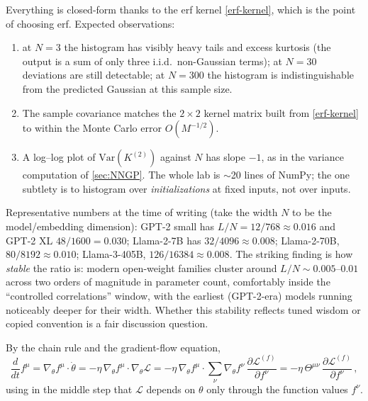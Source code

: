 \documentclass[11pt]{article}
\newcommand{\CL}{{\mathcal L}}
\newcommand{\pd}{\partial}
\begin{document}
\begin{solution}
Everything is closed-form thanks to the erf kernel \eqref{erf-kernel}, which is the point of choosing erf. Expected observations:
\begin{enumerate}
  \item at $N=3$ the histogram has visibly heavy tails and excess kurtosis (the output is a sum of only three i.i.d.\ non-Gaussian terms); at $N=30$ deviations are still detectable; at $N=300$ the histogram is indistinguishable from the predicted Gaussian at this sample size.
  \item The sample covariance matches the $2\times2$ kernel matrix built from \eqref{erf-kernel} to within the Monte Carlo error $O(M^{-1/2})$.
  \item A log--log plot of $\mathrm{Var}(K^{(2)})$ against $N$ has slope $-1$, as in the variance computation of \cref{sec:NNGP}. The whole lab is $\sim$20 lines of NumPy; the one subtlety is to histogram over \emph{initializations} at fixed inputs, not over inputs.
\end{enumerate}
\end{solution}

\begin{solution}[ex:LN-llms]
Representative numbers at the time of writing (take the width $N$ to be the model/embedding dimension): GPT-2 small has $L/N = 12/768 \approx 0.016$ and GPT-2 XL $48/1600 = 0.030$; Llama-2-7B has $32/4096 \approx 0.008$; Llama-2-70B, $80/8192 \approx 0.010$; Llama-3-405B, $126/16384 \approx 0.008$. The striking finding is how \emph{stable} the ratio is: modern open-weight families cluster around $L/N \sim 0.005$--$0.01$ across two orders of magnitude in parameter count, comfortably inside the ``controlled correlations'' window, with the earliest (GPT-2-era) models running noticeably deeper for their width. Whether this stability reflects tuned wisdom or copied convention is a fair discussion question.
\end{solution}

\begin{solution}
By the chain rule and the gradient-flow equation,
\begin{equation*}
    \frac{d}{dt} f^\mu = \nabla_\theta f^\mu \cdot \dot\theta = -\eta\, \nabla_\theta f^\mu \cdot \nabla_\theta \CL
    = -\eta\, \nabla_\theta f^\mu \cdot \sum_\nu \nabla_\theta f^\nu\, \frac{\pd \CL^{(f)}}{\pd f^\nu}
    = -\eta\, \Theta^{\mu\nu}\, \frac{\pd \CL^{(f)}}{\pd f^\nu}\,,
\end{equation*}
using in the middle step that $\CL$ depends on $\theta$ only through the function values $f^\nu$.
\end{solution}
\end{document}
